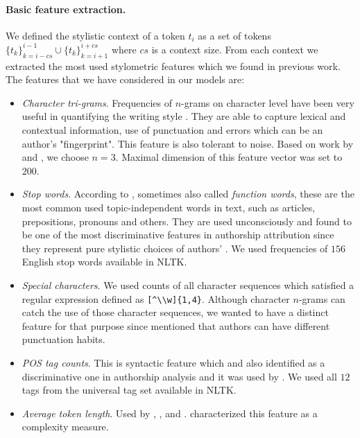 \documentclass[10pt, a4paper]{article}
\begin{document}
\paragraph{Basic feature extraction.} 
We defined the stylistic context of a token $t_i$ as a set of tokens $\{t_k\}_{k=i-cs}^{i-1} \cup \{t_k\}_{k=i+1}^{i+cs}$ where $cs$ is a context size. From each context we extracted the most used stylometric features which we found in previous work. The features that we have considered in our models are:
\begin{itemize}
	\item \emph{Character tri-grams}. Frequencies of $n$-grams on character level have been very useful in quantifying the writing style \citep{stamatatos-2009b}. They are able to capture lexical and contextual information, use of punctuation and errors which can be an author's "fingerprint". This feature is also tolerant to noise. Based on work by \citet{stamatatos-2009a} and \citet{rahman-2015}, we choose $n=3$. Maximal dimension of this feature vector was set to $200$.
	\item \emph{Stop words}. According to \citet{stamatatos-2009a}, sometimes also called \emph{function words}, these are the most common used topic-independent words in text, such as articles, prepositions, pronouns and others. They are used unconsciously and found to be one of the most discriminative features in authorship attribution since they represent pure stylistic choices of authors' \citep{burrows-1987,argamon-2005}. We used frequencies of $156$ English stop words available in NLTK.
	\item \emph{Special characters}. We used counts of all character sequences which satisfied a regular expression defined as \verb/[^\\w]{1,4}/. Although character $n$-grams can catch the use of those character sequences, we wanted to have a distinct feature for that purpose since \citet{koppel-2009} mentioned that authors can have different punctuation habits.
	\item \emph{POS tag counts}. This is syntactic feature which \citet{koppel-2009} and \citet{stamatatos-2009a} also identified as a discriminative one in authorship analysis and it was used by \citet{kuznetsov-2016}. We used all $12$ tags from the universal tag set available in NLTK.
	\item \emph{Average token length}. Used by \citet{kuznetsov-2016}, \citet{sittar-2016},  \citet{brooke-2012} and \citet{stein-2011}. \citet{koppel-2009} characterized this feature as a complexity measure.

\end{itemize}
\end{document}
